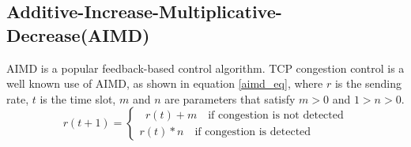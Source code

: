 


\subsection{Additive-Increase-Multiplicative-Decrease(AIMD)}
AIMD\cite{aimd} is a popular feedback-based control algorithm. TCP congestion control is a well known use of AIMD, as shown in equation \ref{aimd_eq}, where $r$ is the sending rate, $t$ is the time slot, $m$ and $n$ are parameters that satisfy $m>0$ and $1>n>0$.
\begin{equation}
\label{aimd_eq}
r(t+1)=\left\{\begin{matrix}
\phantom{a}r(t)+m \quad \text{if congestion is not detected}\\
r(t)* n \quad \text{if congestion is detected} \quad
\end{matrix}\right.
\end{equation}

